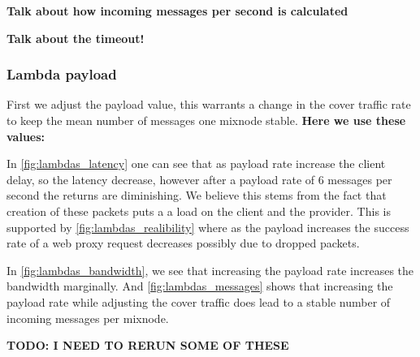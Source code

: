 \documentclass[a4paper,11pt,oneside]{report}
\begin{document}
\textbf{Talk about how incoming messages per second is calculated}

\textbf{Talk about the timeout!}

\subsubsection{Lambda payload}

First we adjust the payload value, this warrants a change in the cover traffic rate to keep the mean number of messages one mixnode stable. \textbf{Here we use these values: }

In \autoref{fig:lambdas_latency} one can see that as payload rate increase the client delay, so the latency decrease, however after a payload rate of 6 messages per second the returns are diminishing. We believe this stems from the fact that creation of these packets puts a a load on the client and the provider. This is supported by \autoref{fig:lambdas_realibility} where as the payload increases the success rate of a web proxy request decreases possibly due to dropped packets.

In \autoref{fig:lambdas_bandwidth}, we see that increasing the payload rate increases the bandwidth marginally. And \autoref{fig:lambdas_messages} shows that increasing the payload rate while adjusting the cover traffic does lead to a stable number of incoming messages per mixnode.

\textbf{TODO: I NEED TO RERUN SOME OF THESE}
\end{document}
